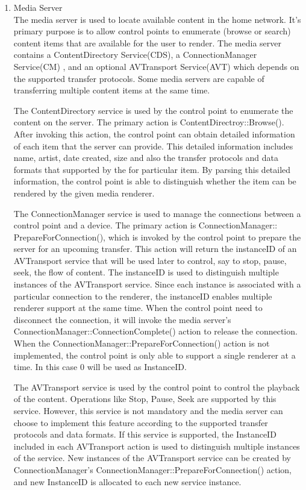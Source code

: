 \begin{enumerate} 
\item Media Server \\ 
The media server is used to locate available content in the home network. It's 
primary purpose is to allow control points to enumerate (browse or search) 
content items that are available for the user to render. The media server 
contains a ContentDirectory Service(CDS), a ConnectionManager Service(CM) 
, and an optional AVTransport Service(AVT) which depends on the supported 
transfer protocols. Some media servers are capable of transferring multiple 
content items at the same time. 

The ContentDirectory service is used by the control point to enumerate the content 
on the server. The primary action is ContentDirectroy::Browse(). After 
invoking this action, the control point can obtain detailed information of each 
item that the server can provide. This detailed information includes name, 
artist, date created, size and also the transfer protocols and data formats that 
supported by the for particular item. By parsing this detailed information, 
the control point is able to distinguish whether the item can be rendered by the 
given media renderer. 

The ConnectionManager service is used to manage the connections between a 
control point and a device. The primary action is 
ConnectionManager:: PrepareForConnection(), which is invoked by the control 
point to prepare the server for an upcoming transfer. This 
action will return the instanceID of an AVTransport service that will be used 
later to control, say to stop, pause, seek, the flow of content. The instanceID is used to distinguish multiple instances of the AVTransport service. Since each instance is associated with a particular connection to the renderer, the instanceID enables multiple renderer support at the same time. When the 
control point need to disconnect the connection, it will invoke the media 
server's ConnectionManager::ConnectionComplete() action to release the 
connection. When the ConnectionManager::PrepareForConnection() action is not 
implemented, the control point is only able to support a single renderer at a 
time. In this case 0 will be used as InstanceID. 

The AVTransport service is used by the control point to control the playback of the 
content. Operations like Stop, Pause, Seek are supported by this service. However, this 
service is not mandatory and the media server can choose to implement this feature 
according to the supported transfer protocols and data formats. If this service 
is supported, the InstanceID included in each AVTransport action is used to 
distinguish multiple instances of the service. New instances of the AVTransport 
service can be created by ConnectionManager's 
ConnectionManager::PrepareForConnection() action, and new InstanceID is 
allocated to each new service instance. 


\end{enumerate}

